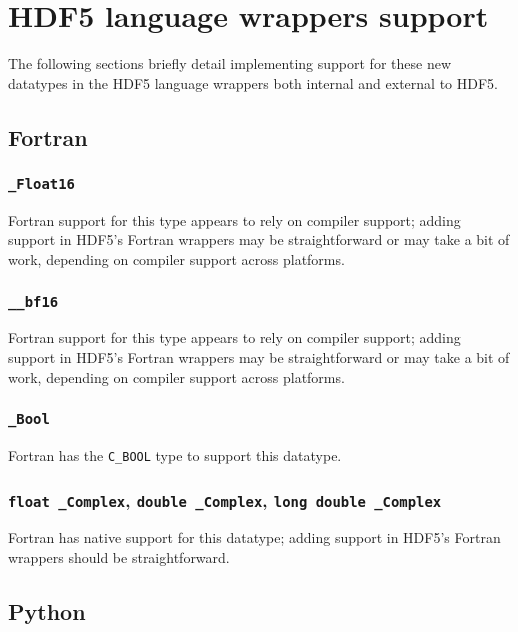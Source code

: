 \documentclass[../HDF5_RFC.tex]{subfiles}
\begin{document}
\section{HDF5 language wrappers support}
\label{wrappers}

The following sections briefly detail implementing support for these new datatypes in the HDF5
language wrappers both internal and external to HDF5.

\subsection{Fortran}

\subsubsection{\texttt{\_Float16}}

Fortran support for this type appears to rely on compiler support; adding support in HDF5's Fortran
wrappers may be straightforward or may take a bit of work, depending on compiler support across platforms.

\subsubsection{\texttt{\_\_bf16}}

Fortran support for this type appears to rely on compiler support; adding support in HDF5's Fortran
wrappers may be straightforward or may take a bit of work, depending on compiler support across platforms.

\subsubsection{\texttt{\_Bool}}

Fortran has the \texttt{C\_BOOL} type to support this datatype.

\subsubsection{\texttt{float \_Complex}, \texttt{double \_Complex}, \texttt{long double \_Complex}}

Fortran has native support for this datatype; adding support in HDF5's Fortran wrappers should be straightforward.

\subsection{Python}
\end{document}
